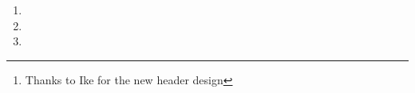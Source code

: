 \documentclass{article}
\title{\titleme}
\author{\authorme\thanks{Thanks to Ike for the new header design}}
\begin{document}
\maketitle

\begin{enumerate}
    \item 
    \item 
    \item 
\end{enumerate}
\end{document}
